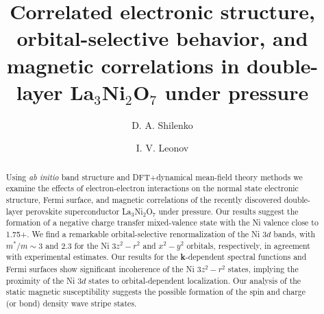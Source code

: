 \documentclass[prl,twocolumn,preprintnumbers,superscriptaddress]{revtex4-1}
\begin{document}
\title{Correlated electronic structure, orbital-selective behavior, and magnetic correlations in double-layer La$_3$Ni$_2$O$_7$ under pressure}

\author{D. A. Shilenko}

\author{I. V. Leonov}



\begin{abstract}
Using \emph{ab initio} band structure and DFT+dynamical mean-field theory methods we examine the effects of 
electron-electron interactions on the normal state electronic structure, Fermi surface, and magnetic correlations of the recently discovered double-layer perovskite superconductor La$_3$Ni$_2$O$_7$ under pressure.
%
Our results suggest the formation of a negative charge transfer mixed-valence state with the Ni valence close to 1.75+. 
%
We find a remarkable orbital-selective renormalization of the Ni $3d$ bands, with $m^*/m \sim 3$ and 2.3 for the Ni $3z^2-r^2$ and $x^2-y^2$ orbitals, respectively, in agreement with experimental estimates.
% 
Our results for the {\bf k}-dependent spectral functions and Fermi surfaces show significant incoherence of the Ni $3z^2-r^2$ states, implying the proximity of the Ni $3d$ states to orbital-dependent localization. Our analysis of the static magnetic susceptibility suggests the possible formation of the spin and charge (or bond) density wave stripe states. 
\end{abstract}

\maketitle

\end{document}
